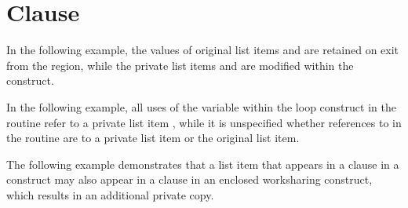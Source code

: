 \pagebreak
\section{ Clause}
\label{sec:private}

In the following example, the values of original list items  and  
are retained on exit from the  region, while the private list 
items  and  are modified within the  construct. 



In the following example, all uses of the variable  within the loop construct 
in the routine  refer to a private list item , while it is 
unspecified whether references to  in the routine  are to a 
private list item or the original list item.



The following example demonstrates that a list item that appears in a  
 clause in a  construct may also appear in a  
 clause in an enclosed worksharing construct, which results in an additional private 
copy.




